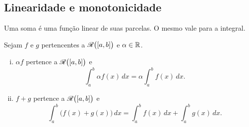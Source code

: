 \subsection{Linearidade e monotonicidade}

Uma soma é uma função linear de suas parcelas. O mesmo vale para a integral.

\begin{prop}[Linearidade]
\label{prop:integrallinear}
Sejam $f$ e $g$ pertencentes a ${\mathscr{R}}\bigl([a,b]\bigr)$ e $\alpha \in {\mathbb{R}}$.
\begin{enumerate}[(i)]
\item $\alpha f$ pertence a ${\mathscr{R}}\bigl([a,b]\bigr)$ e
\begin{equation*}
\int_a^b \alpha f(x) \,dx = \alpha \int_a^b f(x) \,dx .
\end{equation*}
\item $f+g$ pertence a ${\mathscr{R}}\bigl([a,b]\bigr)$ e
\begin{equation*}
\int_a^b \bigl( f(x)+g(x) \bigr) \,dx = 
\int_a^b f(x) \,dx 
+
\int_a^b g(x) \,dx .
\end{equation*}
\end{enumerate}
\end{prop}

